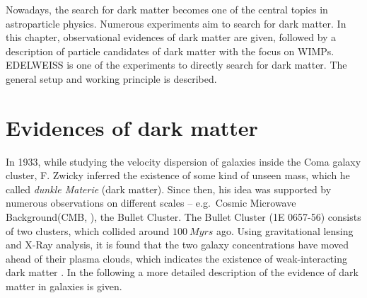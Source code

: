 
Nowadays, the search for dark matter becomes one of the central topics in astroparticle physics.  Numerous experiments aim to search for dark matter. In this chapter, observational evidences of dark matter are given, followed by a description of particle candidates of dark matter with the focus on WIMPs. EDELWEISS is one of the experiments to directly search for dark matter. The general setup and working principle is described.

\section{Evidences of dark matter}
In 1933, while studying the velocity dispersion of galaxies inside the Coma galaxy cluster, F. Zwicky inferred the existence of some kind of unseen mass, which he called \textit{dunkle Materie} (dark matter). Since then, his idea was supported by numerous observations on different scales -- e.g.\ Cosmic Microwave Background(CMB, \cite{Pla16}), the Bullet Cluster.
The Bullet Cluster (1E 0657-56) consists of two clusters, which collided around $\SI{100}{Myrs}$ ago. Using gravitational lensing and X-Ray analysis, it is found that the two galaxy concentrations have moved ahead of their plasma clouds, which indicates the existence of weak-interacting dark matter \cite{Clo06}.
In the following a more detailed description of the evidence of dark matter in galaxies is given.

